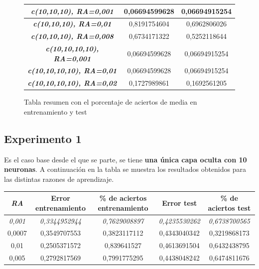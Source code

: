 \documentclass{uc3mpracticas}
\begin{document}
\begin{figure}[!h]
\begin{center}
\begin{tabular}{|c|c|c|}
        \textit{\textbf{c(10,10,10), RA=0,001}}&  0,06694599628                         &  0,06694915254               \\ \hline
        \rowcolor{LightGreen}
        \textit{\textbf{c(10,10,10), RA=0,01}}&  0,8191754604                         &  0,6962806026               \\ \hline
        \textit{\textbf{c(10,10,10), RA=0,008}}&  0,6734171322                         &  0,5252118644               \\ \hline \hline \hline

        \textit{\textbf{c(10,10,10,10), RA=0,001}}&  0,06694599628                        &  0,06694915254               \\ \hline
        \textit{\textbf{c(10,10,10,10), RA=0,01}}&  0,06694599628                         &  0,06694915254               \\ \hline
        \rowcolor{LightGreen}
        \textit{\textbf{c(10,10,10,10), RA=0,02}}&  0,1727989861                         &  0,1692561205               \\ \hline
  \end{tabular}
\end{center}
\caption*{Tabla resumen con el porcentaje de aciertos de media en entrenamiento y test}
\end{figure}



\subsection{Experimento 1}

Es el caso base desde el que se parte, se tiene \textbf{una única capa oculta con 10 neuronas}. A continuación en la tabla se muestra los resultados obtenidos para las distintas razones de aprendizaje.

\begin{center}
  \begin{tabular}{|c|c|c|c|c|}
    \hline
    \rowcolor{Gray}
        \textit{\textbf{RA}}  & \textbf{Error entrenamiento} & \textbf{\% de aciertos entrenamiento} & \textbf{Error test} & \textbf{\% de aciertos test}\\ \hline
        \rowcolor{LightGreen}
        \textit{0,001}        &  \textit{0,3344952944}       &  \textit{0,7629008897}                & \textit{0,4235530262}& \textit{0,6738700565}      \\ \hline
        0,0007                &  0,3549707553                &  0,3823117112                         &  0,4343040342       &  0,3219868173               \\ \hline
        0,01                  &  0,2505371572                &  0,839641527                          &  0,4613691504       &  0,6432438795               \\ \hline
        0,005                 &  0,2792817569                &  0,7991775295                         &  0,4438048242       &  0,6474811676               \\ \hline

  \end{tabular}
\end{center}
\end{document}
